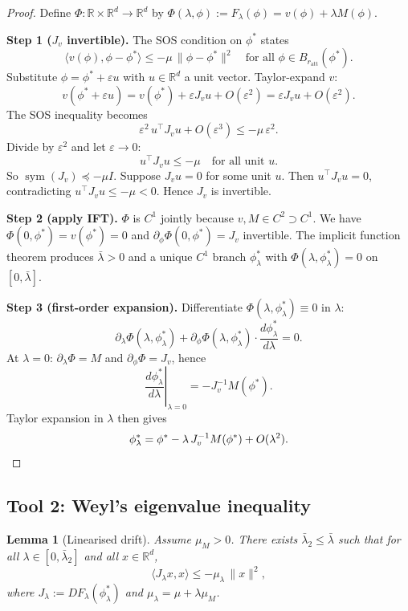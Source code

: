 \documentclass[11pt]{article}
\newtheorem{lemma}{Lemma}
\newcommand{\R}{\mathbb{R}}
\newcommand{\sym}{\operatorname{sym}}
\begin{document}
\begin{proof}
Define $\Phi : \R \times \R^d \to \R^d$ by $\Phi(\lambda, \phi) := F_\lambda(\phi) = v(\phi) + \lambda M(\phi)$.

\textbf{Step 1 ($J_v$ invertible).}
The SOS condition on $\phi^*$ states
\[
\langle v(\phi), \phi - \phi^*\rangle \le -\mu\, \|\phi - \phi^*\|^2 \quad \text{for all } \phi \in B_{r_{\mathrm{att}}}(\phi^*).
\]
Substitute $\phi = \phi^* + \varepsilon u$ with $u \in \R^d$ a unit vector. Taylor-expand $v$:
\[
v(\phi^* + \varepsilon u) = v(\phi^*) + \varepsilon J_v u + O(\varepsilon^2) = \varepsilon J_v u + O(\varepsilon^2).
\]
The SOS inequality becomes
\[
\varepsilon^2\, u^\top J_v u + O(\varepsilon^3) \le -\mu\, \varepsilon^2.
\]
Divide by $\varepsilon^2$ and let $\varepsilon \to 0$:
\[
u^\top J_v u \le -\mu \quad \text{for all unit } u.
\]
So $\sym(J_v) \preceq -\mu I$. Suppose $J_v u = 0$ for some unit $u$. Then $u^\top J_v u = 0$, contradicting $u^\top J_v u \le -\mu < 0$. Hence $J_v$ is invertible.

\textbf{Step 2 (apply IFT).}
$\Phi$ is $C^1$ jointly because $v, M \in C^2 \supset C^1$. We have $\Phi(0, \phi^*) = v(\phi^*) = 0$ and $\partial_\phi \Phi(0, \phi^*) = J_v$ invertible. The implicit function theorem produces $\bar\lambda > 0$ and a unique $C^1$ branch $\phi^*_\lambda$ with $\Phi(\lambda, \phi^*_\lambda) = 0$ on $[0, \bar\lambda]$.

\textbf{Step 3 (first-order expansion).}
Differentiate $\Phi(\lambda, \phi^*_\lambda) \equiv 0$ in $\lambda$:
\[
\partial_\lambda \Phi(\lambda, \phi^*_\lambda) + \partial_\phi \Phi(\lambda, \phi^*_\lambda) \cdot \frac{d\phi^*_\lambda}{d\lambda} = 0.
\]
At $\lambda = 0$: $\partial_\lambda \Phi = M$ and $\partial_\phi \Phi = J_v$, hence
\[
\left.\frac{d\phi^*_\lambda}{d\lambda}\right|_{\lambda = 0} = -J_v^{-1} M(\phi^*).
\]
Taylor expansion in $\lambda$ then gives
\[
\phi^*_\lambda = \phi^* - \lambda\, J_v^{-1} M(\phi^*) + O(\lambda^2). \qedhere
\]
\end{proof}

\subsection{Tool 2: Weyl's eigenvalue inequality}

\begin{lemma}[Linearised drift]\label{lem:weyl}
Assume $\mu_M > 0$. There exists $\bar\lambda_2 \le \bar\lambda$ such that for all $\lambda \in [0, \bar\lambda_2]$ and all $x \in \R^d$,
\[
\langle J_\lambda x, x\rangle \le -\mu_\lambda\, \|x\|^2,
\]
where $J_\lambda := DF_\lambda(\phi^*_\lambda)$ and $\mu_\lambda = \mu + \lambda \mu_M$.
\end{lemma}
\end{document}
